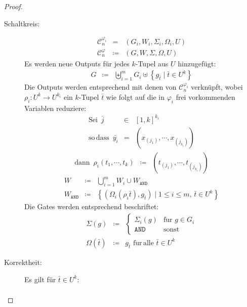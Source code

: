 \begin{proof}
\begin{casenv}
\begin{description}
\item [{Schaltkreis:}] 
\begin{eqnarray*}
\mathcal{C}_{n}^{\varphi_{i}} & = & \left(G_{i},W_{i},\Sigma_{i},\Omega_{i},U\right)\\
\mathcal{C}_{n}^{\varphi} & \coloneqq & \left(G,W,\Sigma,\Omega,U\right)
\end{eqnarray*}
Es werden neue Outputs für jedes $k$-Tupel aus $U$ hinzugefügt:
\begin{eqnarray*}
G & \coloneqq & \biguplus_{i=1}^{m}G_{i}\uplus\left\{ g_{\bar{t}}\mid\bar{t}\in U^{k}\right\} 
\end{eqnarray*}
Die Outputs werden entsprechend mit denen von $\mathcal{C}_{n}^{\varphi_{i}}$
verknüpft, wobei $\rho_{i}:U^{k}\rightarrow U^{k_{i}}$ ein $k$-Tupel
$\bar{t}$ wie folgt auf die in $\varphi_{i}$ frei vorkommenden Variablen
reduziere:
\begin{eqnarray*}
\mathrm{Sei}\,\,\,\bar{j} & \in & \left[1,k\right]^{k_{i}}\\
\mathrm{so}\,\mathrm{dass}\,\,\,\bar{y_{i}} & = & \left(x_{\left(j_{1}\right)},\cdots,x_{\left(j_{k_{i}}\right)}\right)
\end{eqnarray*}
\begin{eqnarray*}
\mathrm{dann}\,\,\,\rho_{i}\left(t_{1},\cdots,t_{k}\right) & \coloneqq & \left(t_{\left(j_{1}\right)},\cdots,t_{\left(j_{k_{i}}\right)}\right)
\end{eqnarray*}
\begin{eqnarray*}
W & \coloneqq & \bigcup_{i=1}^{m}W_{i}\cup W_{\mathtt{AND}}\\
W_{\mathtt{AND}} & \coloneqq & \left\{ \left(\Omega_{i}\left(\rho_{i}\bar{t}\right),g_{\bar{t}}\right)\mid1\leqslant i\leqslant m,\,\bar{t}\in U^{k}\right\} 
\end{eqnarray*}
Die Gates werden entsprechend beschriftet:
\begin{eqnarray*}
\Sigma\left(g\right) & \coloneqq & \begin{cases}
\Sigma_{i}\left(g\right) & \mathrm{f\ddot{u}r}\,\,g\in G_{i}\\
\mathtt{AND} & \mathrm{sonst}
\end{cases}\\
\Omega\left(\bar{t}\right) & \coloneqq & g_{\bar{t}}\,\,\mathrm{f\ddot{u}r\,alle\,\,}\bar{t}\in U^{k}
\end{eqnarray*}
\item [{Korrektheit:}] Es gilt für $\bar{t}\in U^{k}$: 
\begin{eqnarray*}

\end{eqnarray*}
\end{description}
\end{casenv}
\end{proof}
